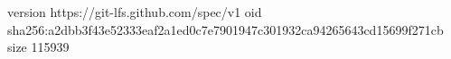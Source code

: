 version https://git-lfs.github.com/spec/v1
oid sha256:a2dbb3f43e52333eaf2a1ed0c7e7901947c301932ca94265643cd15699f271cb
size 115939
